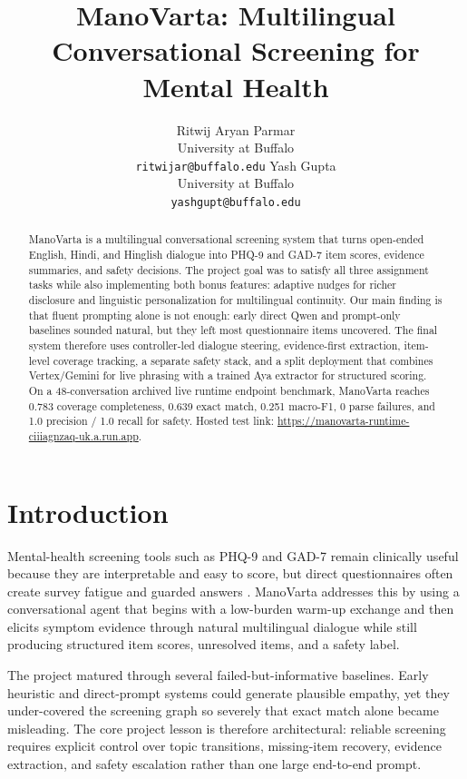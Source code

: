 \documentclass[11pt]{article}
\title{ManoVarta: Multilingual Conversational Screening for Mental Health}
\author{
  Ritwij Aryan Parmar \\
  University at Buffalo \\
  \texttt{ritwijar@buffalo.edu}
  \And
  Yash Gupta \\
  University at Buffalo \\
  \texttt{yashgupt@buffalo.edu}
}
\begin{document}
\maketitle

\begin{abstract}
ManoVarta is a multilingual conversational screening system that turns open-ended English, Hindi, and Hinglish dialogue into PHQ-9 and GAD-7 item scores, evidence summaries, and safety decisions. The project goal was to satisfy all three assignment tasks while also implementing both bonus features: adaptive nudges for richer disclosure and linguistic personalization for multilingual continuity. Our main finding is that fluent prompting alone is not enough: early direct Qwen and prompt-only baselines sounded natural, but they left most questionnaire items uncovered. The final system therefore uses controller-led dialogue steering, evidence-first extraction, item-level coverage tracking, a separate safety stack, and a split deployment that combines Vertex/Gemini for live phrasing with a trained Aya extractor for structured scoring. On a 48-conversation archived live runtime endpoint benchmark, ManoVarta reaches 0.783 coverage completeness, 0.639 exact match, 0.251 macro-F1, 0 parse failures, and 1.0 precision / 1.0 recall for safety. Hosted test link: \url{https://manovarta-runtime-ciiiagnzaq-uk.a.run.app}.
\end{abstract}

\section{Introduction}
Mental-health screening tools such as PHQ-9 and GAD-7 remain clinically useful because they are interpretable and easy to score, but direct questionnaires often create survey fatigue and guarded answers \citep{kroenke2001phq9,spitzer2006gad7}. ManoVarta addresses this by using a conversational agent that begins with a low-burden warm-up exchange and then elicits symptom evidence through natural multilingual dialogue while still producing structured item scores, unresolved items, and a safety label.

The project matured through several failed-but-informative baselines. Early heuristic and direct-prompt systems could generate plausible empathy, yet they under-covered the screening graph so severely that exact match alone became misleading. The core project lesson is therefore architectural: reliable screening requires explicit control over topic transitions, missing-item recovery, evidence extraction, and safety escalation rather than one large end-to-end prompt.
\end{document}
